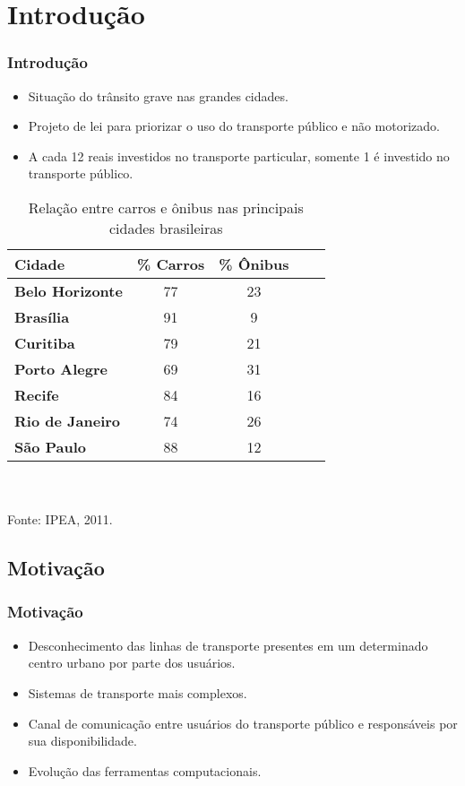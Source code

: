 \section{Introdução}

\frame
{
\frametitle{Introdução}
\begin{itemize}
\item Situação do trânsito grave nas grandes cidades.
\item Projeto de lei para priorizar o uso do transporte público e não motorizado.
\item A cada 12 reais investidos no transporte particular, somente 1 é investido no transporte público.
\end{itemize}

\begin{table}[!htb]
	\scriptsize
	\centering
	\caption{Relação entre carros e ônibus nas principais cidades brasileiras}
	\label{tab:carro_onibus}
	\begin{tabular}{lcccc}
		\hline
		\textbf{Cidade} & \textbf{\% Carros} & \textbf{\% Ônibus} \\
		\hline
		\textbf{Belo Horizonte} & 77 & 23 \\
		\textbf{Brasília} & 91 & 9 \\
		\textbf{Curitiba} & 79 & 21 \\
		\textbf{Porto Alegre} & 69 & 31 \\
		\textbf{Recife} & 84 & 16 \\
		\textbf{Rio de Janeiro} & 74 & 26 \\
		\textbf{São Paulo} & 88 & 12 \\
		\hline
	\end{tabular}
	\\ ~ \\
	\tiny
	Fonte: IPEA, 2011.
\end{table}
}

\subsection{Motivação}
\frame
{
\frametitle{Motivação}
\begin{itemize}
\item Desconhecimento das linhas de transporte presentes em um determinado centro urbano por parte dos usuários.
\item Sistemas de transporte mais complexos.
\item Canal de comunicação entre usuários do transporte público e responsáveis por sua disponibilidade.
\item Evolução das ferramentas computacionais.
\end{itemize}
}

